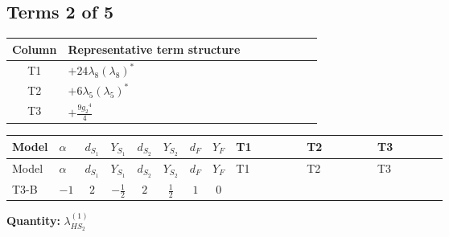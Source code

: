\documentclass[8pt]{article}
\begin{document}
\begin{landscape}
\subsection*{Terms 2 of 5}
\begin{center}
\begin{tabular}{@{}c >{\raggedright\arraybackslash}p{0.82\linewidth}@{}}
\toprule
Column & Representative term structure \\
\midrule
T1 & \(\displaystyle +24 {\lambda_8} \left({\lambda_8}\right)^{*}\) \\
\midrule
T2 & \(\displaystyle +6 {\lambda_5} \left({\lambda_5}\right)^{*}\) \\
\midrule
T3 & \(\displaystyle +\frac{9 {g_2}^4}{4}\) \\
\midrule
\bottomrule
\end{tabular}
\end{center}
\smallskip
\tiny
\begin{longtable}{@{}llcccccc >{\raggedright\arraybackslash}p{0.21\linewidth} >{\raggedright\arraybackslash}p{0.21\linewidth} >{\raggedright\arraybackslash}p{0.21\linewidth}@{}}
\toprule
Model & $\alpha$ & $d_{S_1}$ & $Y_{S_1}$ & $d_{S_2}$ & $Y_{S_2}$ & $d_F$ & $Y_F$ & T1 & T2 & T3 \\
\midrule
\endfirsthead
\toprule
Model & $\alpha$ & $d_{S_1}$ & $Y_{S_1}$ & $d_{S_2}$ & $Y_{S_2}$ & $d_F$ & $Y_F$ & T1 & T2 & T3 \\
\midrule
\endhead
T3-B & $-1$ & $2$ & $-\frac{1}{2}$ & $2$ & $\frac{1}{2}$ & $1$ & $0$ & \scriptsize\adjustbox{max width=\linewidth}{$\begin{gathered} +24 {\lambda_8} \left({\lambda_8}\right)^{*}\end{gathered}$} & \scriptsize\adjustbox{max width=\linewidth}{$\begin{gathered} +6 {\lambda_5} \left({\lambda_5}\right)^{*}\end{gathered}$} & \scriptsize\adjustbox{max width=\linewidth}{$\begin{gathered} +\frac{9 {g_2}^4}{4}\end{gathered}$} \\
\midrule
\bottomrule
\end{longtable}
\clearpage
\noindent\textbf{Quantity: }$\lambda_{HS_2}^{(1)}$\par\smallskip

\end{landscape}
\end{document}
